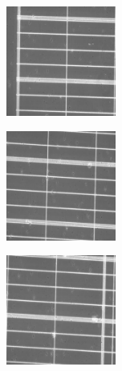 \documentclass{article}
\begin{document}
\begin{figure}[H]
  \centering
  \begin{subfigure}{3.6cm}
    \centering\includegraphics[width=3.6cm]{Data218_frame0.jpg}
  \end{subfigure}
  \begin{subfigure}{3.6cm}
    \centering\includegraphics[width=3.6cm]{Data216_frame0.jpg}
  \end{subfigure}
  \begin{subfigure}{3.6cm}
    \centering\includegraphics[width=3.6cm]{Data217_frame0.jpg}
  \end{subfigure}
  \\
  

\end{figure}
\end{document}
